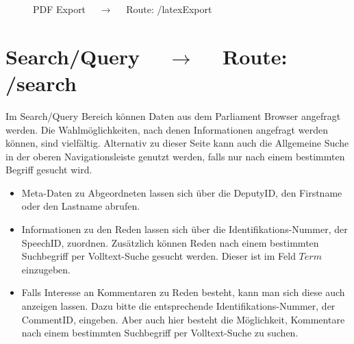 \documentclass[10pt]{report}
\begin{document}
\begin{figure}[H]
	\begin{center}		
  	 \end{center}
	\caption{PDF Export  $\quad\rightarrow\quad$  Route:  /latexExport}	
 \end{figure}


\section{Search/Query $\quad\rightarrow\quad$  Route:  /search}

Im Search/Query Bereich können Daten aus dem Parliament Browser angefragt werden. Die Wahlmöglichkeiten, nach denen Informationen angefragt werden können, sind vielfältig.
Alternativ zu dieser Seite kann auch die Allgemeine Suche in der oberen Navigationsleiste genutzt werden, falls nur nach einem bestimmten Begriff gesucht wird. \\
\begin{itemize}
\item Meta-Daten zu Abgeordneten lassen sich über die DeputyID, den Firstname oder den Lastname abrufen.
\item Informationen zu den Reden lassen sich über die Identifikations-Nummer, der SpeechID, zuordnen. 
Zusätzlich können Reden nach einem bestimmten Suchbegriff per Volltext-Suche gesucht werden.
Dieser ist im Feld $Term$ einzugeben.
\item Falls Interesse an Kommentaren zu Reden besteht, kann man sich diese auch anzeigen lassen. 
Dazu bitte die entsprechende Identifikations-Nummer, der CommentID, eingeben.
Aber auch hier besteht die Möglichkeit, Kommentare nach einem bestimmten Suchbegriff per Volltext-Suche zu suchen.
 \end{itemize}
\end{document}

